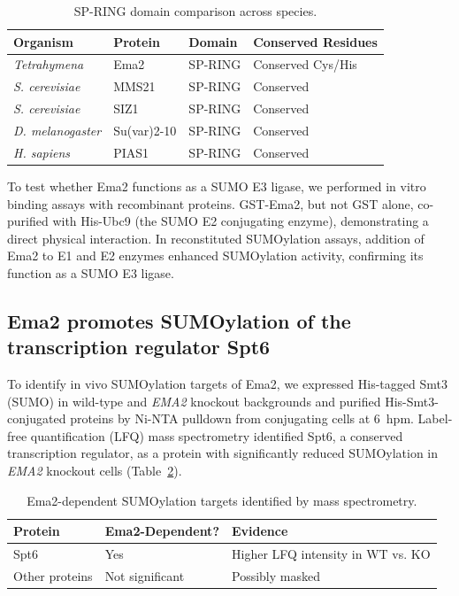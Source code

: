 \documentclass[11pt,a4paper]{article}
\begin{document}
\begin{table}[htbp]
\centering
\caption{SP-RING domain comparison across species.}
\label{tab:spring}
\begin{tabular}{llll}
\toprule
\textbf{Organism} & \textbf{Protein} & \textbf{Domain} & \textbf{Conserved Residues} \\
\midrule
\textit{Tetrahymena} & Ema2 & SP-RING & Conserved Cys/His \\
\textit{S. cerevisiae} & MMS21 & SP-RING & Conserved \\
\textit{S. cerevisiae} & SIZ1 & SP-RING & Conserved \\
\textit{D. melanogaster} & Su(var)2-10 & SP-RING & Conserved \\
\textit{H. sapiens} & PIAS1 & SP-RING & Conserved \\
\bottomrule
\end{tabular}
\end{table}

To test whether Ema2 functions as a SUMO E3 ligase, we performed in vitro binding assays with recombinant proteins. GST-Ema2, but not GST alone, co-purified with His-Ubc9 (the SUMO E2 conjugating enzyme), demonstrating a direct physical interaction. In reconstituted SUMOylation assays, addition of Ema2 to E1 and E2 enzymes enhanced SUMOylation activity, confirming its function as a SUMO E3 ligase.

\subsection{Ema2 promotes SUMOylation of the transcription regulator Spt6}

To identify in vivo SUMOylation targets of Ema2, we expressed His-tagged Smt3 (SUMO) in wild-type and \textit{EMA2} knockout backgrounds and purified His-Smt3-conjugated proteins by Ni-NTA pulldown from conjugating cells at 6~hpm. Label-free quantification (LFQ) mass spectrometry identified Spt6, a conserved transcription regulator, as a protein with significantly reduced SUMOylation in \textit{EMA2} knockout cells (Table~\ref{tab:sumo}).

\begin{table}[htbp]
\centering
\caption{Ema2-dependent SUMOylation targets identified by mass spectrometry.}
\label{tab:sumo}
\begin{tabular}{lll}
\toprule
\textbf{Protein} & \textbf{Ema2-Dependent?} & \textbf{Evidence} \\
\midrule
Spt6 & Yes & Higher LFQ intensity in WT vs. KO \\
Other proteins & Not significant & Possibly masked \\
\bottomrule
\end{tabular}
\end{table}
\end{document}
